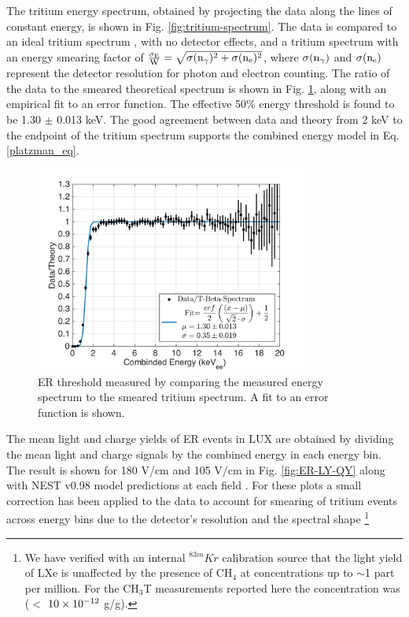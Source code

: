 The tritium energy spectrum, obtained by projecting the data along the lines of constant energy, is shown in Fig. \ref{fig:tritium-spectrum}. The data is compared to an ideal tritium spectrum \cite{Tritium_Eq_Simpson}, with no detector effects, and a tritium spectrum with an energy smearing factor of $\rm \frac{\sigma_E}{W} = \sqrt{\sigma(n_{\gamma})^2 + \sigma(n_e)^2}$, where $\rm \sigma(n_{\gamma})$ and $\rm \sigma(n_e)$ represent the detector resolution for photon and electron counting. The ratio of the data to the smeared theoretical spectrum is shown in Fig. \ref{fig:ER-threshold}, along with an empirical fit to an error function. The effective 50\% energy threshold is found to be 1.30 $\pm$ 0.013 keV. The good agreement between data and theory from 2 keV to the endpoint of the tritium spectrum supports the combined energy model in Eq.\ref{platzman_eq}.

\begin{figure}[h!]\centering
\includegraphics[width=90mm]{fig/E_Thres_Fit.png}
\caption{ER threshold measured by comparing the measured energy spectrum to the smeared tritium spectrum. A fit to an error function is shown.}
\label{fig:ER-threshold}
\end{figure}




The mean light and charge yields of ER events in LUX are obtained by dividing the mean light and charge signals by the combined energy in each energy bin. The result is shown for 180 V/cm and 105 V/cm in Fig. \ref{fig:ER-LY-QY} along with NEST v0.98 model predictions at each field \cite{NEST_2013}. For these plots a small correction has been applied to the data to account for smearing of tritium events across energy bins due to the detector's resolution and the spectral shape \cite{Dobi_Thesis}\footnote{We have verified with an internal $^{83m}Kr$ calibration source that the light yield of LXe is unaffected by the presence of CH$_4$ at concentrations up to $\sim$1 part per million. For the CH$_3$T measurements reported here the concentration was ($<$ $\rm10\times10^{-12}$ g/g). }


